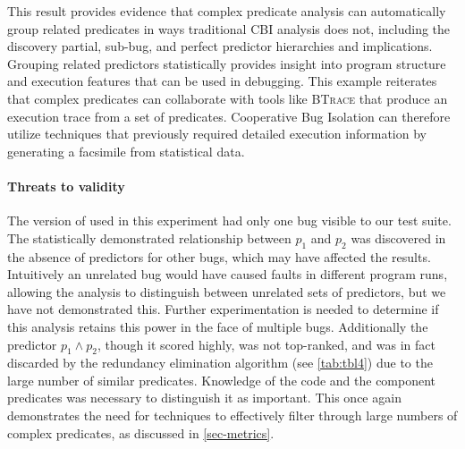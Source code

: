 This result provides evidence that complex predicate analysis can automatically group related predicates in ways traditional CBI analysis does not, including the discovery partial, sub-bug, and perfect predictor hierarchies and implications.  Grouping related predictors statistically provides insight into program structure and execution features that can be used in debugging.  This example reiterates that complex predicates can collaborate with tools like \textsc{BTrace} that produce an execution trace from a set of predicates.  Cooperative Bug Isolation can therefore utilize techniques that previously required detailed execution information by generating a facsimile from statistical data.

\paragraph{Threats to validity}

The version of  used in this experiment had only one bug visible to our test suite.  The statistically demonstrated relationship between $p_1$ and $p_2$ was discovered in the absence of predictors for other bugs, which may have affected the results.  Intuitively an unrelated bug would have caused faults in different program runs, allowing the analysis to distinguish between unrelated sets of predictors, but we have not demonstrated this.  Further experimentation is needed to determine if this analysis retains this power in the face of multiple bugs.  Additionally the predictor $p_1 \wedge p_2$, though it scored highly, was not top-ranked, and was in fact discarded by the redundancy elimination algorithm (see \autoref{tab:tbl4}) due to the large number of similar predicates.  Knowledge of the code and the component predicates was necessary to distinguish it as important.  This once again demonstrates the need for techniques to effectively filter through large numbers of complex predicates, as discussed in \autoref{sec-metrics}.

